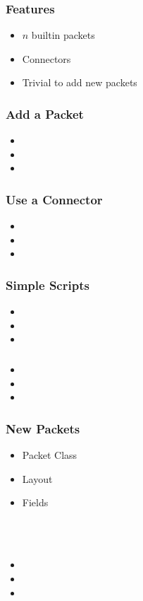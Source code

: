 \begin{frame}
	\frametitle{Features}
	\begin{itemize}
	\item $n$ builtin packets
	\item Connectors
	\item Trivial to add new packets
	\end{itemize}
\end{frame}

\begin{frame}
	\frametitle{Add a Packet}
	\begin{itemize}
	\item
	\item
	\item
	\end{itemize}
\end{frame}

\begin{frame}
	\frametitle{Use a Connector}
	\begin{itemize}
	\item
	\item
	\item
	\end{itemize}
\end{frame}

\begin{frame}
	\frametitle{Simple Scripts}
	\begin{itemize}
	\item
	\item
	\item
	\end{itemize}
\end{frame}

\begin{frame}
	\frametitle{}
	\begin{itemize}
	\item
	\item
	\item
	\end{itemize}
\end{frame}

\begin{frame}
	\frametitle{New Packets}
	\begin{itemize}
	\item Packet Class
	\item Layout
	\item Fields
	\end{itemize}
\end{frame}

\begin{frame}
	\frametitle{}
	\begin{lstlisting}

	\end{lstlisting}
\end{frame}

\begin{frame}
	\frametitle{}
	\begin{lstlisting}

	\end{lstlisting}
\end{frame}

\begin{frame}
	\frametitle{}
	\begin{itemize}
	\item
	\item
	\item
	\end{itemize}
\end{frame}

